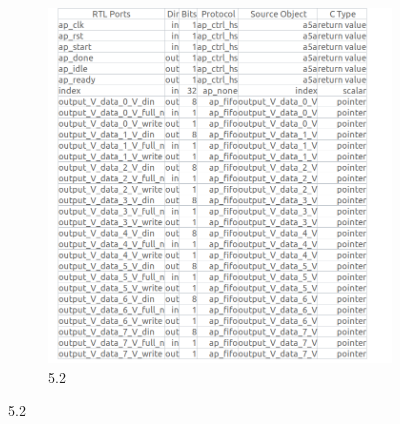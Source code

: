 \documentclass{article}
\begin{document}
\begin{figure}[h]
\begin{subfigure}[b]{0.5\textwidth}
\includegraphics[width=\textwidth]{figs/33b.png}
    \caption{5.2}
    \label{fig:my_label}
\end{subfigure}
\end{figure}
\vspace{15cm}
\end{document}
